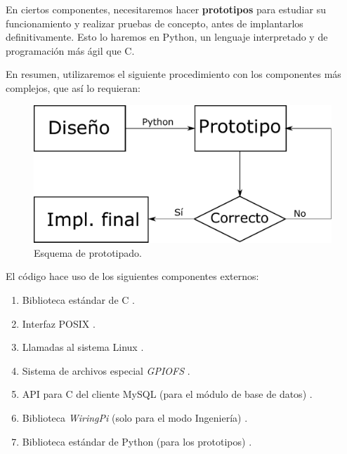 En ciertos componentes, necesitaremos hacer \textbf{prototipos} para estudiar su funcionamiento y realizar pruebas de concepto, antes de implantarlos definitivamente. Esto lo haremos en Python, un lenguaje interpretado y de programación más ágil que C.

En resumen, utilizaremos el siguiente procedimiento con los componentes más complejos, que así lo requieran:

\smallskip

\begin{figure}[H]
	\noindent \begin{centering}
		\includegraphics[width=\linewidth/2]{capitulo5/prototipado}
		\par\end{centering}
	\smallskip
	\caption{\label{fig:prototipado} Esquema de prototipado.}
\end{figure} 

\smallskip

El código hace uso de los siguientes componentes externos:

\begin{enumerate}
	\item Biblioteca estándar de C \cite{cplusplus}.
	\item Interfaz \acrshort{POSIX} \cite{wiki_posix}.
	\item Llamadas al sistema Linux \cite{manpages}.
	\item Sistema de archivos especial \textit{GPIOFS} \cite{gpiofs}.
	\item \acrshort{API} para C del cliente MySQL (para el módulo de base de datos) \cite{mysql}.
	\item Biblioteca \textit{WiringPi} (solo para el modo Ingeniería) \cite{wiringpi}.
	\item Biblioteca estándar de Python (para los prototipos) \cite{python}.
\end{enumerate}

